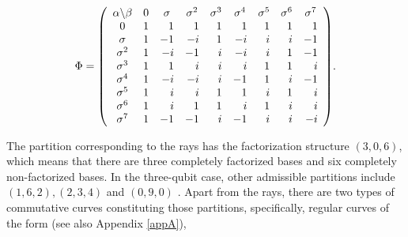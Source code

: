 \documentclass[quantumrep,article,submit,pdftex,moreauthors]{Definitions/mdpi}
\begin{document}
\begin{equation}
  \Phi
  =\left( 
  \begin{array}{ccccccccc}
    \alpha \backslash \beta & 0 & \sigma & \sigma ^{2} & \sigma ^{3} & \sigma
    ^{4} & \sigma ^{5} & \sigma ^{6} & \sigma ^{7} \\ 
    0 & \multicolumn{1}{r}{1} & \multicolumn{1}{r}{1} & \multicolumn{1}{r}{1} & 
    \multicolumn{1}{r}{1} & \multicolumn{1}{r}{1} & \multicolumn{1}{r}{1} & 
    \multicolumn{1}{r}{1} & \multicolumn{1}{r}{1} \\ 
    \sigma & \multicolumn{1}{r}{1} & \multicolumn{1}{r}{-1} & \multicolumn{1}{r}{
    -i} & \multicolumn{1}{r}{1} & \multicolumn{1}{r}{-i} & \multicolumn{1}{r}{i}
    & \multicolumn{1}{r}{i} & \multicolumn{1}{r}{-1} \\ 
    \sigma ^{2} & \multicolumn{1}{r}{1} & \multicolumn{1}{r}{-i} & 
    \multicolumn{1}{r}{-1} & \multicolumn{1}{r}{i} & \multicolumn{1}{r}{-i} & 
    \multicolumn{1}{r}{i} & \multicolumn{1}{r}{1} & \multicolumn{1}{r}{-1} \\ 
    \sigma ^{3} & \multicolumn{1}{r}{1} & \multicolumn{1}{r}{1} & 
    \multicolumn{1}{r}{i} & \multicolumn{1}{r}{i} & \multicolumn{1}{r}{i} & 
    \multicolumn{1}{r}{1} & \multicolumn{1}{r}{1} & \multicolumn{1}{r}{i} \\ 
    \sigma ^{4} & \multicolumn{1}{r}{1} & \multicolumn{1}{r}{-i} & 
    \multicolumn{1}{r}{-i} & \multicolumn{1}{r}{i} & \multicolumn{1}{r}{-1} & 
    \multicolumn{1}{r}{1} & \multicolumn{1}{r}{i} & \multicolumn{1}{r}{-1} \\ 
    \sigma ^{5} & \multicolumn{1}{r}{1} & \multicolumn{1}{r}{i} & 
    \multicolumn{1}{r}{i} & \multicolumn{1}{r}{1} & \multicolumn{1}{r}{1} & 
    \multicolumn{1}{r}{i} & \multicolumn{1}{r}{1} & \multicolumn{1}{r}{i} \\ 
    \sigma ^{6} & \multicolumn{1}{r}{1} & \multicolumn{1}{r}{i} & 
    \multicolumn{1}{r}{1} & \multicolumn{1}{r}{1} & \multicolumn{1}{r}{i} & 
    \multicolumn{1}{r}{1} & \multicolumn{1}{r}{i} & \multicolumn{1}{r}{i} \\ 
    \sigma ^{7} & \multicolumn{1}{r}{1} & \multicolumn{1}{r}{-1} & 
    \multicolumn{1}{r}{-1} & \multicolumn{1}{r}{i} & \multicolumn{1}{r}{-1} & 
    \multicolumn{1}{r}{i} & \multicolumn{1}{r}{i} & \multicolumn{1}{r}{-i}
  \end{array}
  \right).
  \label{ray dps}
\end{equation}

The partition corresponding to the rays has the factorization structure
$(3,0,6)$, which means that there are three completely factorized bases and six
completely non-factorized bases. In the three-qubit case, other admissible
partitions include $(1,6,2),(2,3,4)$ and $(0,9,0)$ \cite{factor1,factor2}. Apart
from the rays, there are two types of commutative curves constituting those
partitions, specifically, regular curves of the form \cite{GS2} (see also
Appendix \ref{appA}), 
\end{document}
